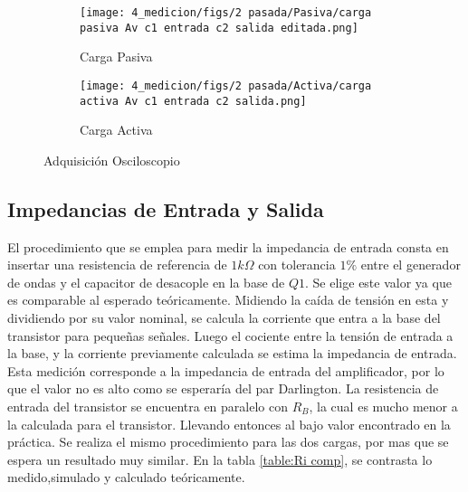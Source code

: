 
\begin{figure}[ht]
\begin{subfigure}{.45\textwidth}
  \centering
  \texttt{[image: 4\_medicion/figs/2 pasada/Pasiva/carga pasiva Av c1 entrada c2 salida editada.png]}  
  \caption{Carga Pasiva}
  \label{fig:Av carga pasiva}
\end{subfigure}
\begin{subfigure}{.45\textwidth}
  \centering
  \texttt{[image: 4\_medicion/figs/2 pasada/Activa/carga activa Av c1 entrada c2 salida.png]}  
  \caption{Carga Activa}
  \label{fig:Av carga activa}
\end{subfigure}
\caption{Adquisición Osciloscopio}
\label{fig:Av oscilo}
\end{figure}

\subsection{Impedancias de Entrada y Salida}

El procedimiento que se emplea para medir la impedancia de entrada consta en insertar una resistencia de referencia de $1 k\Omega$ con tolerancia $1\%$ entre el generador de ondas y el capacitor de desacople en la base de $Q1$. Se elige este valor ya que es comparable al esperado teóricamente.
Midiendo la caída de tensión en esta y dividiendo por su valor nominal, se calcula la corriente que entra a la base del transistor para pequeñas señales. Luego el cociente entre la tensión de entrada a la base, y la corriente previamente calculada se estima la impedancia de entrada. Esta medición corresponde a la impedancia de entrada del amplificador, por lo que el valor no es alto como se esperaría del par Darlington.
La resistencia de entrada del transistor se encuentra en paralelo con $R_B$, la cual es mucho menor a la calculada para el transistor. Llevando entonces al bajo valor encontrado en la práctica.
Se realiza el mismo procedimiento para las dos cargas, por mas que se espera un resultado muy similar. En la tabla \ref{table:Ri comp}, se contrasta lo medido,simulado y calculado teóricamente.

